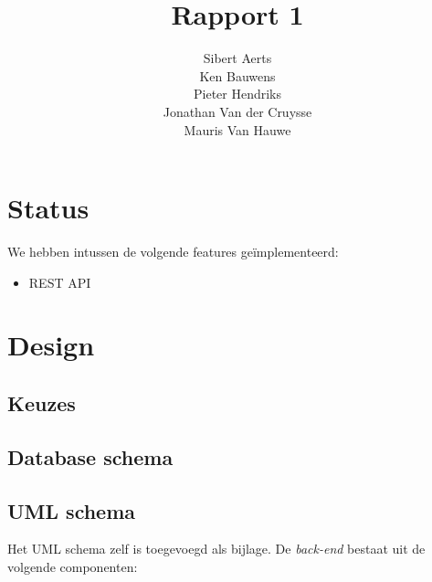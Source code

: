 \documentclass[12pt,a4paper]{article}
\begin{document}
\title{Rapport 1}
\author{Sibert Aerts \\ Ken Bauwens \\ Pieter Hendriks \\ Jonathan Van der Cruysse \\ Mauris Van Hauwe}
\maketitle

\newcommand{\code}[1]{\texttt{#1}}

\section{Status}

We hebben intussen de volgende features ge\"implementeerd:

\begin{itemize}

\item REST API

\end{itemize}

\section{Design}

\subsection{Keuzes}

\subsection{Database schema}

\subsection{UML schema}

Het UML schema zelf is toegevoegd als bijlage. De \emph{back-end} bestaat uit de volgende componenten:
\end{document}
